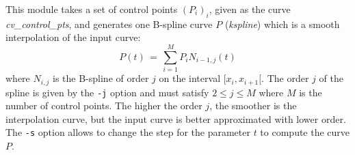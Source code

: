 This module takes a set of control points $(P_i)_i$, given as the curve
{\em cv\_control\_pts}, and
generates one B-spline  curve $P$ ({\em kspline})
which is a smooth interpolation  of the 
input curve:
\[
P(t) \, = \, \sum_{i=1}^{M} P_i N_{i-1,j}(t)
\]
where $N_{i,j}$ is the B-spline of order $j$ on the interval $[x_i,x_{i+1}[$.
The order $j$ of the spline is given by the \verb+-j+ option and must satisfy
$2 \leq j \leq M$ where $M$ is the number of control points.
The higher the order $j$, the smoother is the interpolation curve, but the 
input curve is better approximated with lower order.
The \verb+-s+ option allows to change the step for the parameter $t$ to compute
the curve $P$.

